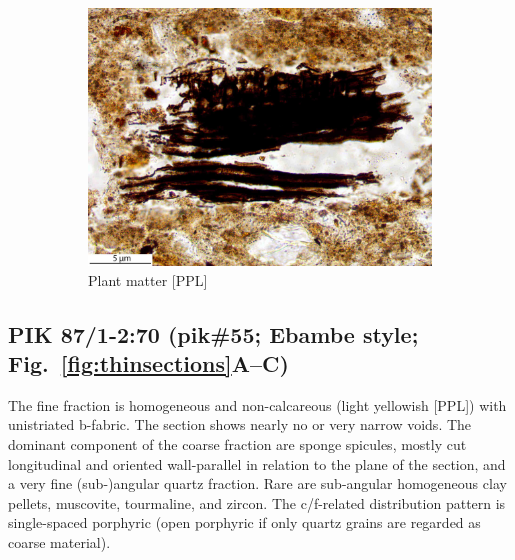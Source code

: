 \documentclass[a4paper]{article}
\begin{document}
\begin{figure}[H]
\begin{subfigure}[t]{.32\textwidth}
		\includegraphics[width=\textwidth]{ThinSections/11-4_40x_PPL.jpg}
		\caption{Plant matter [PPL]}
	\end{subfigure}
	\caption{}
	\label{fig:11_pik}
\end{figure}

\newpage\subsection{PIK 87/1-2:70 (pik\#55; Ebambe style; Fig.~\ref{fig:thinsections}A--C)}

\begin{multicols}{2}
\noindent The fine fraction is homogeneous and non-calcareous (light yellowish [PPL]) with unistriated b-fabric. The section shows nearly no or very narrow voids. The dominant component of the coarse fraction are sponge spicules, mostly cut longitudinal and oriented wall-parallel in relation to the plane of the section, and a very fine (sub-)angular quartz fraction. Rare are sub-angular homogeneous clay pellets, muscovite, tourmaline, and zircon. The c/f-related distribution pattern is single-spaced porphyric (open porphyric if only quartz grains are regarded as coarse material).
\end{multicols}

\end{document}
